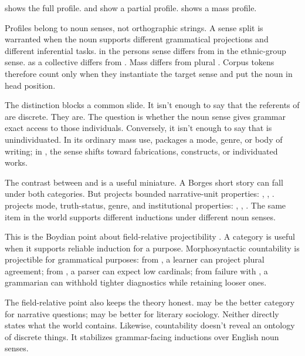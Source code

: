 \documentclass[12pt,a4paper]{article}
\begin{document}
 shows the full profile.  and  show a partial profile.  shows a mass profile.

Profiles belong to noun senses, not orthographic strings. A sense split is warranted when the noun supports different grammatical projections and different inferential tasks.  in the persons sense differs from  in the ethnic-group sense.  as a collective differs from . Mass  differs from plural . Corpus tokens therefore count only when they instantiate the target sense and put the noun in head position.

The distinction blocks a common slide. It isn't enough to say that the referents of  are discrete. They are. The question is whether the noun sense gives grammar exact access to those individuals. Conversely, it isn't enough to say that  is unindividuated. In its ordinary mass use,  packages a mode, genre, or body of writing; in , the sense shifts toward fabrications, constructs, or individuated works.

The contrast between  and  is a useful miniature. A Borges short story can fall under both categories. But  projects bounded narrative-unit properties: , , .  projects mode, truth-status, genre, and institutional properties: , , . The same item in the world supports different inductions under different noun senses.

This is the Boydian point about field-relative projectibility \citep{Goodman1955,boyd1991}. A category is useful when it supports reliable induction for a purpose. Morphosyntactic countability is projectible for grammatical purposes: from , a learner can project plural agreement; from , a parser can expect low cardinals; from failure with , a grammarian can withhold tighter diagnostics while retaining looser ones.

The field-relative point also keeps the theory honest.  may be the better category for narrative questions;  may be better for literary sociology. Neither directly states what the world contains. Likewise, countability doesn't reveal an ontology of discrete things. It stabilizes grammar-facing inductions over English noun senses.
\end{document}
